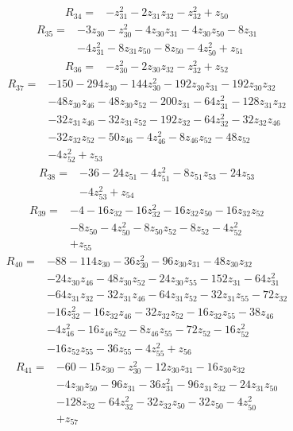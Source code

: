 \begin{align*}
R_{34}={}&-z_{31}^{2}-2z_{31}z_{32}-z_{32}^{2}+z_{50}
\end{align*}
\begin{align*}
R_{35}={}&-3z_{30}-z_{30}^{2}-4z_{30}z_{31}-4z_{30}z_{50}-8z_{31}\\
&-4z_{31}^{2}-8z_{31}z_{50}-8z_{50}-4z_{50}^{2}+z_{51}
\end{align*}
\begin{align*}
R_{36}={}&-z_{30}^{2}-2z_{30}z_{32}-z_{32}^{2}+z_{52}
\end{align*}
\begin{align*}
R_{37}={}&-150-294z_{30}-144z_{30}^{2}-192z_{30}z_{31}-192z_{30}z_{32}\\
&-48z_{30}z_{46}-48z_{30}z_{52}-200z_{31}-64z_{31}^{2}-128z_{31}z_{32}\\
&-32z_{31}z_{46}-32z_{31}z_{52}-192z_{32}-64z_{32}^{2}-32z_{32}z_{46}\\
&-32z_{32}z_{52}-50z_{46}-4z_{46}^{2}-8z_{46}z_{52}-48z_{52}\\
&-4z_{52}^{2}+z_{53}
\end{align*}
\begin{align*}
R_{38}={}&-36-24z_{51}-4z_{51}^{2}-8z_{51}z_{53}-24z_{53}\\
&-4z_{53}^{2}+z_{54}
\end{align*}
\begin{align*}
R_{39}={}&-4-16z_{32}-16z_{32}^{2}-16z_{32}z_{50}-16z_{32}z_{52}\\
&-8z_{50}-4z_{50}^{2}-8z_{50}z_{52}-8z_{52}-4z_{52}^{2}\\
&+z_{55}
\end{align*}
\begin{align*}
R_{40}={}&-88-114z_{30}-36z_{30}^{2}-96z_{30}z_{31}-48z_{30}z_{32}\\
&-24z_{30}z_{46}-48z_{30}z_{52}-24z_{30}z_{55}-152z_{31}-64z_{31}^{2}\\
&-64z_{31}z_{32}-32z_{31}z_{46}-64z_{31}z_{52}-32z_{31}z_{55}-72z_{32}\\
&-16z_{32}^{2}-16z_{32}z_{46}-32z_{32}z_{52}-16z_{32}z_{55}-38z_{46}\\
&-4z_{46}^{2}-16z_{46}z_{52}-8z_{46}z_{55}-72z_{52}-16z_{52}^{2}\\
&-16z_{52}z_{55}-36z_{55}-4z_{55}^{2}+z_{56}
\end{align*}
\begin{align*}
R_{41}={}&-60-15z_{30}-z_{30}^{2}-12z_{30}z_{31}-16z_{30}z_{32}\\
&-4z_{30}z_{50}-96z_{31}-36z_{31}^{2}-96z_{31}z_{32}-24z_{31}z_{50}\\
&-128z_{32}-64z_{32}^{2}-32z_{32}z_{50}-32z_{50}-4z_{50}^{2}\\
&+z_{57}
\end{align*}
